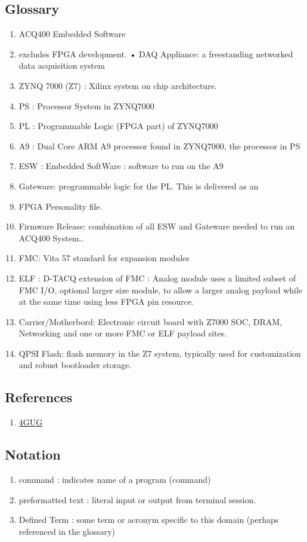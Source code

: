 \documentclass[]{article}
\begin{document}
\subsection{Glossary}
\begin{enumerate}
    \item ACQ400 Embedded Software
    \item excludes FPGA development.
    • DAQ Appliance: a freestanding networked data acquisition system
    \item ZYNQ 7000 (Z7)  : Xilinx system on chip architecture.
    \item PS : Processor System in ZYNQ7000
    \item PL : Programmable Logic (FPGA part) of ZYNQ7000
    \item A9 : Dual Core ARM A9 processor found in ZYNQ7000, the processor in PS
    \item ESW : Embedded SoftWare : software to run on the A9
    \item Gateware: programmable logic for the PL. This is delivered as an 
    \item FPGA Personality file.
    \item Firmware Release: combination of all ESW and Gateware needed to run an ACQ400 System..
    \item FMC: Vita 57 standard for expansion modules
    \item ELF : D-TACQ extension of FMC : Analog module uses a limited subset of FMC I/O, optional larger size module, to allow a larger analog payload while at the same time using less FPGA pin resource.
    \item Carrier/Motherbord: Electronic circuit board with Z7000 SOC, DRAM, Networking and one or more FMC or ELF payload sites.
    \item QPSI Flash: flash memory in the Z7 system, typically used for customization and robust bootloader storage.       
\end{enumerate}

\subsection{References}
\begin{enumerate}
    \item \href{https://github.com/seanalsop/bolodsp-doc/releases}{4GUG}
\end{enumerate} 

\subsection{Notation}
\begin{enumerate}
    \item command   : indicates name of a program (command)
    \item preformatted text : literal input or output from terminal session.
    \item Defined Term : some term or acronym specific to this domain (perhaps referenced in the glossary)
\end{enumerate} 
\end{document}
